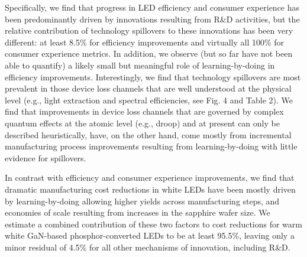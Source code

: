 \documentclass[parskip=full]{article}
\begin{document}
Specifically, we find that progress in LED efficiency and consumer experience has been predominantly driven by innovations resulting from R\&D activities, but the relative contribution of technology spillovers to these innovations has been very different: at least 8.5\% for efficiency improvements and virtually all 100\% for consumer experience metrics. In addition, we observe (but so far have not been able to quantify) a likely small but meaningful role of learning-by-doing in efficiency improvements. Interestingly, we find that technology spillovers are most prevalent in those device loss channels that are well understood at the physical level (e.g., light extraction and spectral efficiencies, see Fig. 4 and Table 2). We find that improvements in device loss channels that are governed by complex quantum effects at the atomic level (e.g., droop) and at present can only be described heuristically, have, on the other hand, come mostly from incremental manufacturing process improvements resulting from learning-by-doing with little evidence for spillovers.

In contrast with efficiency and consumer experience improvements, we find that dramatic manufacturing cost reductions in white LEDs have been mostly driven by learning-by-doing allowing higher yields across manufacturing steps, and economies of scale resulting from increases in the sapphire wafer size. We estimate a combined contribution of these two factors to cost reductions for warm white GaN-based phosphor-converted LEDs to be at least 95.5\%, leaving only a minor residual of 4.5\% for all other mechanisms of innovation, including R\&D.
\end{document}
